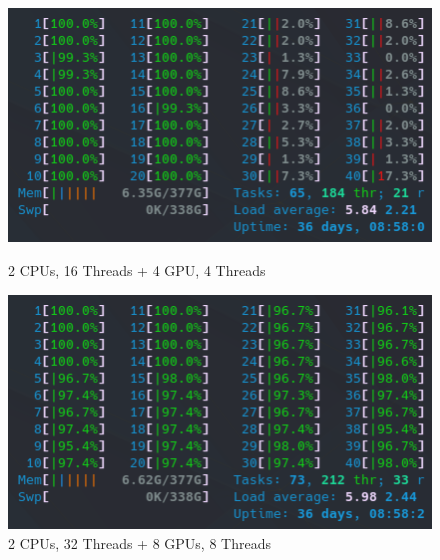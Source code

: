 \begin{figure}[!h]
    \centering
    \captionsetup{width=.48\linewidth}
    \begin{minipage}[t]{0.48\textwidth}
        \includegraphics[width=\textwidth]{figures/htop_hybrid/2CPUs_16Threads___4GPUs_4Threads.png}
        \caption{2 CPUs, 16 Threads + 4 GPU, 4 Threads}\label{fig:2CPUs_16Threads___4GPUs_4Threads}
    \end{minipage}
    \hspace{0.4cm}
    \centering
    \captionsetup{width=.48\linewidth}
    \begin{minipage}[t]{0.48\textwidth}
        \includegraphics[width=\textwidth]{figures/htop_hybrid/2CPU_32Threads___8GPUs_8Threads.png}
        \caption{2 CPUs, 32 Threads + 8 GPUs, 8 Threads}\label{fig:2CPU_32Threads___8GPUs_8Threads}
    \end{minipage}
\end{figure}



